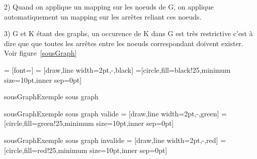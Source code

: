 \documentclass[a4paper, 10pt]{article}
\begin{document}
2) Quand on applique un mapping sur les noeuds de G, on applique automatiquement un mapping sur les arrêtes reliant ces noeuds.

3) G et K étant des graphs, un occurence de K dans G est très restrictive c'est à dire que que toutes les arrêtes entre les noeuds correspondant doivent exister. 
Voir figure~\ref{sousGraph} 

 = [font=\small]
 = [draw,line width=2pt,-,black]
=[circle,fill=black!25,minimum size=10pt,inner sep=0pt]
\begin{myfig}{sousGraph}{Exemple sous graph}
\end{myfig}



\begin{myfig}{sousGraph}{Exemple sous graph valide}
 = [draw,line width=2pt,-,green]
=[circle,fill=green!25,minimum size=10pt,inner sep=0pt]
\end{myfig}


\begin{myfig}{sousGraph}{Exemple sous graph invalide}
 = [draw,line width=2pt,-,red]
=[circle,fill=red!25,minimum size=10pt,inner sep=0pt]
\end{myfig}
\end{document}
